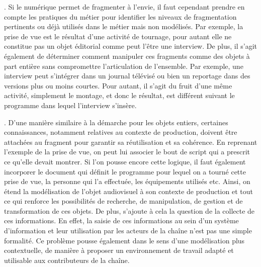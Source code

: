 \begin{liste}
	\item {}.
	Si le numérique permet de fragmenter à l'envie, il faut cependant prendre en compte les pratiques du métier pour identifier les niveaux de fragmentation pertinents ou déjà utilisés dans le métier mais non modélisés.
	Par exemple, la prise de vue est le résultat d'une activité de tournage, pour autant elle ne constitue pas un objet éditorial comme peut l'être une interview.
	De plus, il s'agit également de déterminer comment manipuler ces fragments comme des objets à part entière sans compromettre l'articulation de l'ensemble. 
	Par exemple, une interview peut s'intégrer dans un journal télévisé ou bien un reportage dans des versions plus ou moins courtes. 
	Pour autant, il s'agit du fruit d'une même activité, simplement le montage, et donc le résultat, est différent suivant le programme dans lequel l'interview s'insère.\\
	
	\item {}.
	D'une manière similaire à la démarche pour les objets entiers, certaines connaissances, notamment relatives au contexte de production, doivent être attachées au fragment pour garantir sa réutilisation et sa cohérence. 
	En reprenant l'exemple de la prise de vue, on peut lui associer le bout de script qui a prescrit ce qu'elle devait montrer. 
	Si l'on pousse encore cette logique, il faut également incorporer le document qui définit le programme pour lequel on a tourné cette prise de vue, la personne qui l'a effectuée, les équipements utilisés etc. 
	Ainsi, on étend la modélisation de l'objet audiovisuel à son contexte de production et tout ce qui renforce les possibilités de recherche, de manipulation, de gestion et de transformation de ces objets. 
	De plus, s'ajoute à cela la question de la collecte de ces informations. 
	En effet, la saisie de ces informations au sein d'un système d'information et leur utilisation par les acteurs de la chaîne n'est pas une simple formalité.
	Ce problème pousse également dans le sens d'une modélisation plus contextuelle, de manière à proposer un environnement de travail adapté et utilisable aux contributeurs de la chaîne.\\
	

\end{liste}
